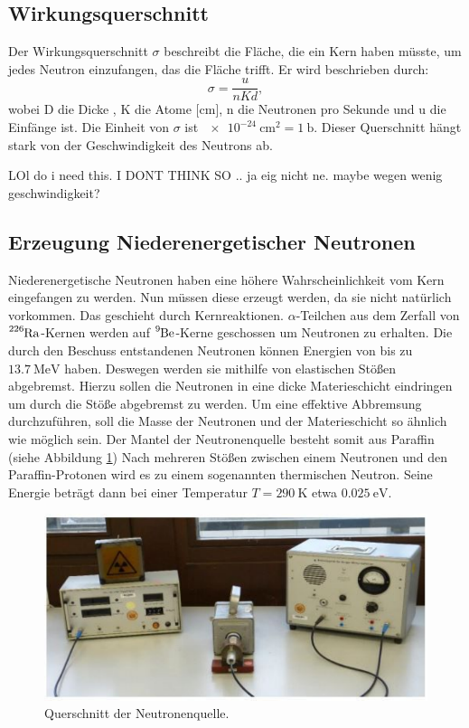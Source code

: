 \subsection{Wirkungsquerschnitt}
\label{subsec:Wirkungsquerschnitt}
Der Wirkungsquerschnitt $\sigma$ beschreibt die Fläche, die ein Kern haben müsste, um jedes Neutron einzufangen, das die Fläche trifft.
Er wird beschrieben durch:
\begin{equation*}
    \sigma =\frac{u}{nKd} ,
\end{equation*}
wobei D die Dicke , K die Atome [\si{\centi\meter}], n die Neutronen pro Sekunde und u die Einfänge ist.
Die Einheit von $\sigma$ ist $\SI{e-24}{\centi\metre\squared} = \SI{1}{\barn}$.
Dieser Querschnitt hängt stark von der Geschwindigkeit des Neutrons ab.

LOl do i need this. I DONT THINK SO .. ja eig nicht ne.
maybe wegen wenig geschwindigkeit?

\subsection{Erzeugung Niederenergetischer Neutronen}
\label{subsec:NeutronenHerstellen}
Niederenergetische Neutronen haben eine höhere Wahrscheinlichkeit vom Kern eingefangen zu werden.
Nun müssen diese erzeugt werden, da sie nicht natürlich vorkommen.
Das geschieht durch Kernreaktionen.
$\alpha$-Teilchen aus dem Zerfall von $\ce{^{226}Ra}$-Kernen werden auf $\ce{^{9}Be}$-Kerne geschossen um Neutronen zu erhalten.
Die durch den Beschuss entstandenen Neutronen können Energien von bis zu $\SI{13.7}{\mega\electronvolt}$ haben.
Deswegen werden sie mithilfe von elastischen Stößen abgebremst.
Hierzu sollen die Neutronen in eine dicke Materieschicht eindringen um durch die Stöße abgebremst zu werden.
Um eine effektive Abbremsung durchzuführen, soll die Masse der Neutronen und der Materieschicht so ähnlich wie möglich sein.
Der Mantel der Neutronenquelle besteht somit aus Paraffin (siehe Abbildung \ref{fig:QuelleQuerschnitt})
Nach mehreren Stößen zwischen einem Neutronen und den Paraffin-Protonen wird es zu einem sogenannten thermischen Neutron.
Seine Energie beträgt dann bei einer Temperatur $T = \SI{290}{\kelvin}$ etwa $\SI{0.025}{\electronvolt}$.

\begin{figure}
    \includegraphics[width =\textwidth]{content/QuerschnittQuelle.pdf}
    \caption{Querschnitt der Neutronenquelle.\cite{anleitung}}
    \label{fig:QuelleQuerschnitt}
\end{figure}

